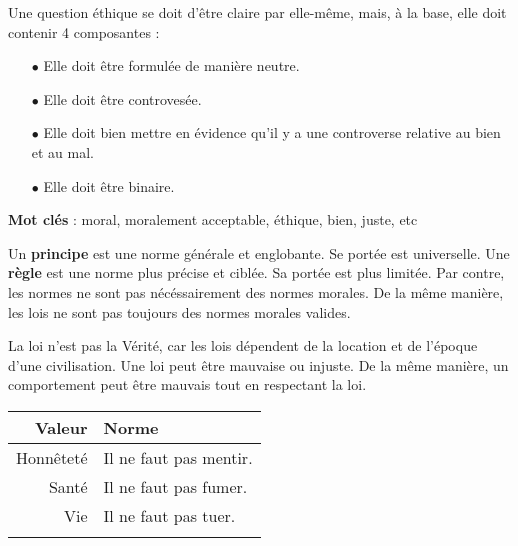 \documentclass[11pt]{article}
\begin{document}

Une question éthique se doit d'être claire par elle-même, mais, à la base, elle doit contenir 4 composantes :
\begin{itemize}
\item[$\bullet$] Elle doit être formulée de manière neutre.
\item[$\bullet$] Elle doit être controvesée.
\item[$\bullet$] Elle doit bien mettre en évidence qu'il y a une controverse relative au bien et au mal.
\item[$\bullet$] Elle doit être binaire.
\end{itemize}
\textbf{Mot clés} : moral, moralement acceptable, éthique, bien, juste, etc


Un \textbf{principe} est une norme générale et englobante. Se portée est universelle.  Une \textbf{règle} est une norme plus précise et ciblée.  Sa portée est plus limitée.  Par contre, les normes ne sont pas nécéssairement des normes morales. De la même manière, les lois ne sont pas toujours des normes morales valides. 


La loi n'est pas la Vérité, car les lois dépendent de la location et de l'époque d'une civilisation. Une loi peut être mauvaise ou injuste. De la même manière, un comportement peut être mauvais tout en respectant la loi.


\begin{center}
\begin{tabular}{@{}rl@{}}
\hline
  \textbf{Valeur}
& \textbf{Norme}\\
\hline
  Honnêteté
& Il ne faut pas mentir.\\
  Santé
& Il ne faut pas fumer.\\
  Vie
& Il ne faut pas tuer.\\
\hline\\
\end{tabular}
\end{center}
\end{document}

